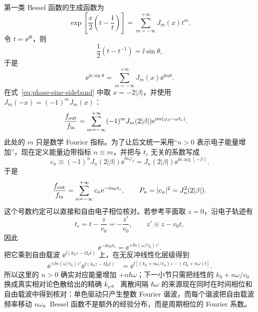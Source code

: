 第一类 Bessel 函数的生成函数为
\begin{equation}
\exp\!\left[\frac{x}{2}\left(t-\frac1t\right)\right]
=\sum_{m=-\infty}^{+\infty}J_m(x)t^m.
\label{eq:bessel-generating-function}
\end{equation}
令 $t=\ee^{\ii\theta}$，则
\begin{equation}
\frac12\left(t-t^{-1}\right)
=\ii\sin\theta,
\end{equation}
于是
\begin{equation}
{
\ee^{\ii x\sin\theta}
=\sum_{m=-\infty}^{+\infty}J_m(x)\ee^{\ii m\theta}.}
\label{eq:JA}
\end{equation}
在式~\cref{eq:phase-sine-sideband} 中取 $x=-2|\beta|$，并使用
$J_m(-x)=(-1)^mJ_m(x)$：
\begin{align}
\frac{f_{\rm out}}{f_{\rm in}}
&=\sum_{m=-\infty}^{+\infty}
(-1)^mJ_m(2|\beta|)
\mathrm{e}^{\mathrm{i} m(\varphi_\beta-\omega t_c)}.
\label{eq:phase-fourier-raw-index}
\end{align}
此处的 $m$ 只是数学 Fourier 指标。为了让后文统一采用“$n>0$ 表示电子能量增加”，现在定义能量边带指标 $n\equiv m$，并把与 $t_c$ 无关的系数写成
\begin{equation}
{
 c_n
 \equiv (-1)^nJ_n(2|\beta|)\ee^{\ii n\varphi_\beta}
 =J_n(2|\beta|)\ee^{\ii n\arg(-\beta)}.}
\label{eq:sideband-amplitude-gain-convention}
\end{equation}
于是
\begin{equation}
{
\frac{f_{\rm out}}{f_{\rm in}}
=\sum_{n=-\infty}^{+\infty}c_n\mathrm{e}^{-\mathrm{i}n\omega t_c},
\qquad
P_n=|c_n|^2=J_n^2(2|\beta|).}
\label{eq:Pn-beta-standard}
\end{equation}
这个号数约定可以直接和自由电子相位核对。若参考平面取 $z=0$，沿电子轨迹有
\begin{equation}
 t_c=t-\frac{z}{v_0}=-\frac{z'}{v_0},
 \qquad z'\equiv z-v_0t,
\end{equation}
因此
\begin{equation}
 \ee^{-\ii n\omega t_c}
 =\ee^{+\ii n(\omega/v_0)z'}.
\label{eq:tc-to-comoving-sideband-phase}
\end{equation}
把它乘到自由载波
$\ee^{\ii(k_0z-\Omega_0t)}$ 上，在无反冲线性化层级得到
\begin{align}
\ee^{+\ii n(\omega/v_0)z'}
\ee^{\ii(k_0z-\Omega_0t)}
&=\ee^{\ii[(k_0+n\omega/v_0)z-(\Omega_0+n\omega)t]}.
\label{eq:gain-index-carrier-check}
\end{align}
所以这里的 $n>0$ 确实对应能量增加 $+n\hbar\omega$；下一小节只需把线性的
$k_0+n\omega/v_0$ 换成真实相对论色散给出的精确 $k_n$。
离散间隔 $\hbar\omega$ 的来源现在同时在时间相位和自由载波中得到核对：单色驱动只产生整数 Fourier 谐波，而每个谐波把自由载波频率移动 $n\omega$。Bessel 函数不是额外的经验分布，而是周期相位的 Fourier 系数。

